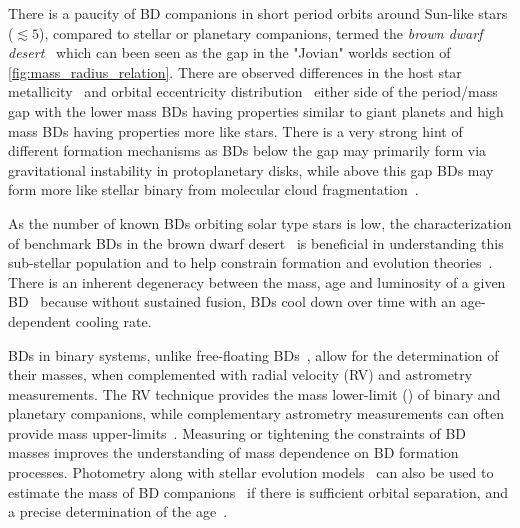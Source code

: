 There is a paucity of {BD} companions in short period orbits around Sun-like stars (\(\lesssim{}5 \)\AU{}), compared to stellar or planetary companions, termed the \emph{brown dwarf desert}~\citep{halbwachs_exploring_2000, zucker_analysis_2001, sahlmann_search_2011, ranc_moa2007blg197_2015} which can been seen as the gap in the "Jovian" worlds section of \cref{fig:mass_radius_relation}.
There are observed differences in the host star metallicity~\citep{maldonado_searching_2017, santos_observational_2017, schlaufman_evidence_2018} and orbital eccentricity distribution~\citep{ma_statistical_2014} either side of the period/mass gap with the lower mass {BD}s having properties similar to giant planets and high mass {BD}s having properties more like stars.
There is a very strong hint of different formation mechanisms as {BD}s below the gap may primarily form via gravitational instability in protoplanetary disks, while above this gap {BD}s may form more like stellar binary from molecular cloud fragmentation~\citep{ma_statistical_2014}.

As the number of known {BD}s orbiting solar type stars is low, the characterization of benchmark {BD}s in the brown dwarf desert~\citep[e.g.][]{crepp_trends_2016} is beneficial in understanding this sub-stellar population and to help constrain formation and evolution theories~\citep{whitworth_formation_2007}.
There is an inherent degeneracy between the mass, age and luminosity of a given BD~\citep{burrows_nongray_1997} because without sustained fusion, {BD}s cool down over time with an age-dependent cooling rate.

{BD}s in binary systems, unlike free-floating {BD}s~\citep[e.g][]{gagne_simp_2017}, allow for the determination of their masses, when complemented with radial velocity ({RV}) and astrometry measurements.
The {RV} technique provides the mass lower-limit (\Mtwosini{}) of binary and planetary companions, while complementary astrometry measurements can often provide mass upper-limits~\citep[e.g.][]{sahlmann_search_2011}.
Measuring or tightening the constraints of {BD} masses improves the understanding of mass dependence on {BD} formation processes.
Photometry along with stellar evolution models~\citep[e.g.][]{baraffe_evolutionary_2003,allard_btsettl_2013} can also be used to estimate the mass of {BD} companions~\citep[e.g.][]{moutou_eccentricity_2017} if there is sufficient orbital separation, and a precise determination of the age~\citep{soderblom_ages_2010}.



